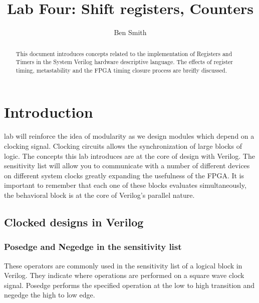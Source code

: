 
\title{Lab Four: Shift registers, Counters}
\author{Ben Smith}




  \maketitle
    \begin{abstract}
      This document introduces concepts related to the implementation of Registers and Timers in the System Verilog hardware descriptive language. The effects of register timing, metastability and the FPGA timing closure process are breifly discussed.
    \end{abstract}
\section{Introduction}
   lab will reinforce the idea of modularity as we design modules which depend on a clocking signal. Clocking circuits allows the synchronization of large blocks of logic. The concepts this lab introduces are at the core of design with Verilog. The sensitivity list will allow you to communicate with a number of different devices on different system clocks greatly expanding the usefulness of the FPGA. It is important to remember that each one of these blocks evaluates simultaneously, the behavioral block is at the core of Verilog's parallel nature. 

  \subsection{Clocked designs in Verilog}

    \subsubsection{Posedge and Negedge in the sensitivity list}
      These operators are commonly used in the sensitivity list of a logical block in Verilog. They indicate where operations are performed on a square wave clock signal. Posedge performs the specified operation at the low to high transition and negedge the high to low edge.
    
